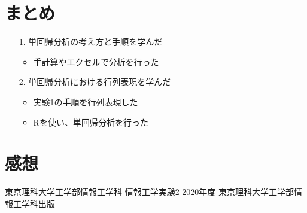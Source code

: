 \documentclass[12pt]{jarticle}
\begin{document}
\section{まとめ}
\begin{itemize}
    \item [1.]単回帰分析の考え方と手順を学んだ
          \begin{itemize}
              \item 手計算やエクセルで分析を行った
          \end{itemize}
    \item [2.]単回帰分析における行列表現を学んだ
          \begin{itemize}
              \item 実験1の手順を行列表現した
              \item Rを使い、単回帰分析を行った
          \end{itemize}
\end{itemize}

\section{感想}


\clearpage
\begin{thebibliography}{99}
    \label{sannkoubunnkenn_chapter}
    東京理科大学工学部情報工学科 情報工学実験2 2020年度
    東京理科大学工学部情報工学科出版
\end{thebibliography}

\clearpage

\appendix
\end{document}
